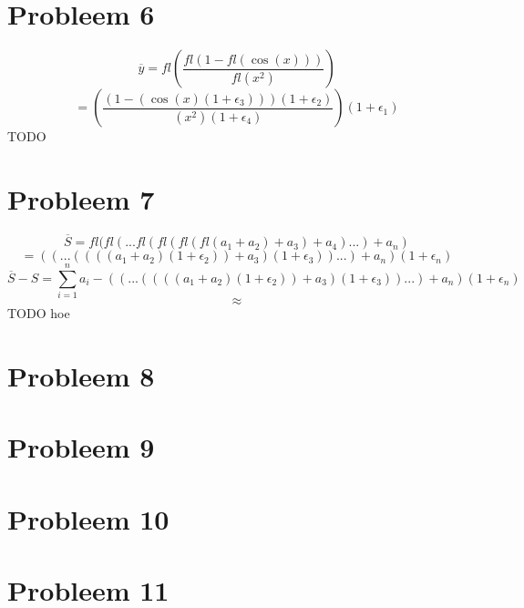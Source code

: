 \documentclass[12pt,a4paper]{article}
\begin{document}
\section{Probleem 6}
\[
\overline{y}
=
fl
\left(
\frac{
fl\left(
1-fl(\cos(x))
\right)}
{fl(x^2)}
\right)
\]
\[
=
\left(
\frac{
\left(
1-(\cos(x)(1+\epsilon_3))
\right)(1+\epsilon_2)}
{(x^2)(1+\epsilon_4)}
\right)(1+\epsilon_1)
\]
TODO

\section{Probleem 7}
\[
\overline{S} = fl(fl(...fl(fl(fl(fl(a_1+a_2)+a_3)+a_4)...)+a_n)
\]
\[
= ((...((((a_1+a_2)(1+\epsilon_2))+a_3)(1+\epsilon_3))...)+a_n)(1+\epsilon_n)
\]
\[
\overline{S}-S = \sum_{i=1}^na_i - ((...((((a_1+a_2)(1+\epsilon_2))+a_3)(1+\epsilon_3))...)+a_n)(1+\epsilon_n)
\]
\[
\approx 
\]
TODO hoe

\section{Probleem 8}
\section{Probleem 9}
\section{Probleem 10}
\section{Probleem 11}
\end{document}
